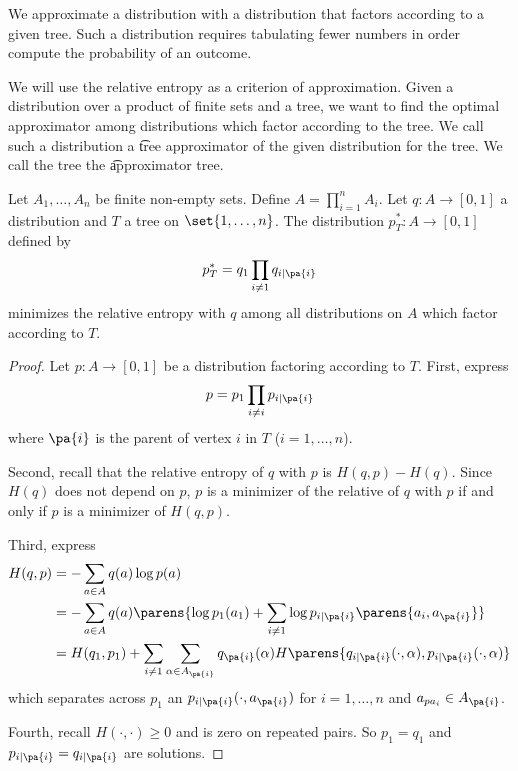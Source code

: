 

We approximate a distribution with a distribution that factors according to a given tree.
Such a distribution requires tabulating fewer numbers in order compute the probability of an outcome.


We will use the relative entropy as a criterion of approximation.
Given a distribution over a product of finite sets and a tree, we want to find the optimal approximator among distributions which factor according to the tree.
We call such a distribution a \t{tree approximator} of the given distribution for the tree.
We call the tree the \t{approximator tree}.


\begin{prop}

Let $A_1, \dots, A_n$ be finite non-empty sets.
Define $A = \prod_{i = 1}^{n} A_i$.
Let $q: A \to [0, 1]$ a distribution and $T$ a tree on $\set{1, \dots, n}$.
The distribution $p^*_T: A \to [0, 1]$ defined by
$$
  p^*_T = q_1 \prod_{i \neq 1} q_{i \mid \pa{i}}
$$
minimizes the relative entropy with $q$ among all distributions on $A$ which factor according to $T$.

\begin{proof}

Let $p: A \to [0, 1]$ be a distribution factoring according to $T$. First, express
$$
  p = p_1 \prod_{i \neq i} p_{i \mid \pa{i}}
$$
where $\pa{i}$ is the parent of vertex $i$ in $T$ ($i = 1, \dots, n$).

Second, recall that the relative entropy of $q$ with $p$ is $H(q, p) - H(q)$.
Since $H(q)$ does not depend on $p$, $p$ is a minimizer of the relative of $q$ with $p$ if and only if $p$ is a minimizer of $H(q, p)$.

Third, express
$$
\begin{aligned}
  H(q, p) &= - \sum_{a \in A} q(a) \log p(a) \\
          &= - \sum_{a \in A} q(a) \parens{\log p_1(a_1) + \sum_{i \neq 1} \log p_{i \mid \pa{i}}\parens{a_i, a_{\pa{i}}}} \\
          &= H(q_1, p_1) + \sum_{i \neq 1} \sum_{\alpha \in A_{\pa{i}}} q_{\pa{i}}(\alpha)H\parens{q_{i\mid\pa{i}}(\cdot, \alpha), p_{i\mid\pa{i}}(\cdot, \alpha)}
\end{aligned}
$$
  which separates across $p_1$ an $p_{i \mid \pa{i}}(\cdot, a_{\pa{i}})$ for $i = 1, \dots, n$ and $a_{pa_{i}} \in A_{\pa{i}}$.

Fourth, recall $H(\cdot, \cdot) \geq 0$ and is zero on repeated pairs.
So $p_1 = q_1$ and $p_{i \mid \pa{i}} = q_{i \mid \pa{i}}$ are solutions.

\end{proof}

\end{prop}

%
